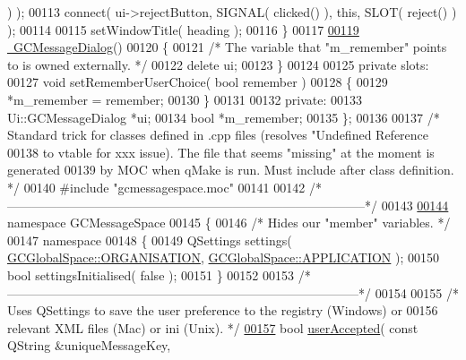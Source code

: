 \begin{DoxyCode}
      ) );
00113     connect( ui->rejectButton, SIGNAL( clicked() ),       \textcolor{keyword}{this}, SLOT( reject() 
      ) );
00114 
00115     setWindowTitle( heading );
00116   \}
00117 
\hypertarget{gcmessagespace_8cpp_source_l00119}{}\hyperlink{class_g_c_message_dialog_ae8f647f3c0a75c154f451d0a4fd6bd9d}{00119}   \hyperlink{class_g_c_message_dialog_ae8f647f3c0a75c154f451d0a4fd6bd9d}{~GCMessageDialog}()
00120   \{
00121     \textcolor{comment}{/* The variable that "m\_remember" points to is owned externally. */}
00122     \textcolor{keyword}{delete} ui;
00123   \}
00124 
00125 \textcolor{keyword}{private} slots:
00127   \textcolor{keywordtype}{void} setRememberUserChoice( \textcolor{keywordtype}{bool} remember )
00128   \{
00129     *m\_remember = remember;
00130   \}
00131 
00132 \textcolor{keyword}{private}:
00133   Ui::GCMessageDialog *ui;
00134   \textcolor{keywordtype}{bool} *m\_remember;
00135 \};
00136 
00137 \textcolor{comment}{/* Standard trick for classes defined in .cpp files (resolves "Undefined
       Reference}
00138 \textcolor{comment}{  to vtable for xxx issue). The file that seems "missing" at the moment is
       generated}
00139 \textcolor{comment}{  by MOC when qMake is run. Must include after class definition. */}
00140 \textcolor{preprocessor}{#include "gcmessagespace.moc"}
00141 
00142 \textcolor{comment}{/*
      --------------------------------------------------------------------------------------*/}
00143 
\hypertarget{gcmessagespace_8cpp_source_l00144}{}\hyperlink{namespace_g_c_message_space}{00144} \textcolor{keyword}{namespace }GCMessageSpace
00145 \{
00146   \textcolor{comment}{/* Hides our "member" variables. */}
00147   \textcolor{keyword}{namespace}
00148   \{
00149     QSettings settings( \hyperlink{namespace_g_c_global_space_a97583835f9987b1c94ff05802ccfe42f}{GCGlobalSpace::ORGANISATION}, \hyperlink{namespace_g_c_global_space_ab53b9c3447f00f1cc45a1d3fdfbba564}{GCGlobalSpace::APPLICATION}
       );
00150     \textcolor{keywordtype}{bool} settingsInitialised( \textcolor{keyword}{false} );
00151   \}
00152 
00153   \textcolor{comment}{/*
      ------------------------------------------------------------------------------------*/}
00154 
00155   \textcolor{comment}{/* Uses QSettings to save the user preference to the registry (Windows) or}
00156 \textcolor{comment}{    relevant XML files (Mac) or ini (Unix). */}
\hypertarget{gcmessagespace_8cpp_source_l00157}{}\hyperlink{namespace_g_c_message_space_ae6f97d25f38a6b35c49e6e67ce4afaca}{00157}   \textcolor{keywordtype}{bool} \hyperlink{namespace_g_c_message_space_ae6f97d25f38a6b35c49e6e67ce4afaca}{userAccepted}( \textcolor{keyword}{const} QString &uniqueMessageKey,

\end{DoxyCode}
